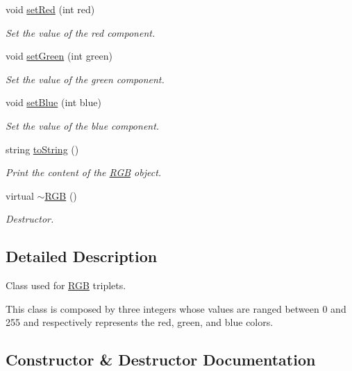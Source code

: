 \begin{DoxyCompactItemize}
void \mbox{\hyperlink{class_r_g_b_a6817b57299fc1ebde6c8c517791bbcd3}{set\+Red}} (int red)
\begin{DoxyCompactList}\small\item\em Set the value of the red component. \end{DoxyCompactList}\item 
void \mbox{\hyperlink{class_r_g_b_a7d576326cbb9e02ebbb7aec901858cf7}{set\+Green}} (int green)
\begin{DoxyCompactList}\small\item\em Set the value of the green component. \end{DoxyCompactList}\item 
void \mbox{\hyperlink{class_r_g_b_a573173b96ccd76621058d224e7745f6d}{set\+Blue}} (int blue)
\begin{DoxyCompactList}\small\item\em Set the value of the blue component. \end{DoxyCompactList}\item 
string \mbox{\hyperlink{class_r_g_b_afc741ad6365b34a61bf3a4e29ea473bf}{to\+String}} ()
\begin{DoxyCompactList}\small\item\em Print the content of the \mbox{\hyperlink{class_r_g_b}{R\+GB}} object. \end{DoxyCompactList}\item 
virtual \mbox{\hyperlink{class_r_g_b_aba3fa8736bbef986a77b56613ddc6275}{$\sim$\+R\+GB}} ()
\begin{DoxyCompactList}\small\item\em Destructor. \end{DoxyCompactList}\end{DoxyCompactItemize}


\subsection{Detailed Description}
Class used for \mbox{\hyperlink{class_r_g_b}{R\+GB}} triplets. 

This class is composed by three integers whose values are ranged between 0 and 255 and respectively represents the red, green, and blue colors. 

\subsection{Constructor \& Destructor Documentation}
\mbox{\label{class_r_g_b_a8d6dc51fefe43b85dc70f0de26a9131c}} 
